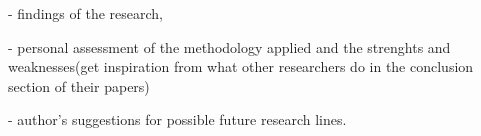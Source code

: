 - findings of the research,

- personal assessment of the methodology applied and the strenghts and weaknesses(get inspiration from what other researchers do in the conclusion section of their papers)

- author's suggestions for possible future research lines.
